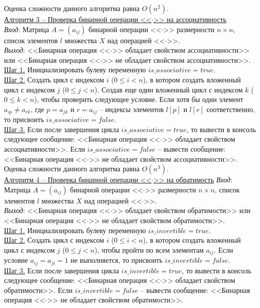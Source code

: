 \documentclass[bachelor, och, labwork]{shiza}
\begin{document}
            Оценка сложности данного алгоритма равна $O(n^2)$.\\

        \underline{Алгоритм 3 -- Проверка бинарной операции <<$\cdot$>> на ассоциативность}\\
            \textit{Вход}: Матрица $A = (a_{ij})$ бинарной операции <<$\cdot$>> размерности $n \times n$, список элементов $l$ множества $X$ над
            операцией <<$\cdot$>>.\\
            \textit{Выход}: <<Бинарная операция <<$\cdot$>> обладает свойством ассоциативности>> или 
            <<Бинарная операция <<$\cdot$>> не обладает свойством ассоциативности>>.\\
            \underline{Шаг 1.} Инициализировать булеву переменную $is\_associative = true$.\\
            \underline{Шаг 2.} Создать цикл с индексом $i$ ($0 \leq i < n$), в котором создать вложенный цикл с индексом $j$ ($0 \leq j < n$).
            Создав еще один вложенный цикл с индексом $k$ ($0 \leq k < n$), чтобы проверить следующее условие. Если хотя бы один элемент 
            $a_{ip} \neq a_{rk}$, где $p = a_{jk}$ и $r = a_{ij}$ -- индексы элементов $l[p]$ и $l[r]$ соответственно, то присвоить 
            $is\_associative = false$.\\
            \underline{Шаг 3.} Если после завершения цикла $is\_associative = true$, то вывести в консоль следующее сообщение:
            <<Бинарная операция <<$\cdot$>> обладает свойством ассоциативности>>. Если $is\_associative = false$ -- вывести сообщение:
            <<Бинарная операция <<$\cdot$>> не обладает свойством ассоциативности>>.\\
            
            Оценка сложности данного алгоритма равна $O(n^3)$.\\
        
            \underline{Алгоритм 4 -- Проверка бинарной операции <<$\cdot$>> на обратимость}
            \textit{Вход}: Матрица $A = (a_{ij})$ бинарной операции <<$\cdot$>> размерности $n \times n$, список элементов $l$ множества $X$ над
            операцией <<$\cdot$>>.\\
            \textit{Выход}: <<Бинарная операция <<$\cdot$>> обладает свойством обратимости>> или 
            <<Бинарная операция <<$\cdot$>> не обладает свойством обратимости>>.\\
            \underline{Шаг 1.} Инициализировать булеву переменную $is\_invertible = true$.\\
            \underline{Шаг 2.} Создать цикл с индексом $i$ ($0 \leq i < n$), в котором создать вложенный цикл с индексом $j$ ($0 \leq j < n$), 
            чтобы пройти по всем элементам $a_{ij}$. Если условие $a_{ij} = a_{ji} = 1$ не выполняется, то присвоить $is\_invertible = false$.\\
            \underline{Шаг 3.} Если после завершения цикла $is\_invertible = true$, то вывести в консоль следующее сообщение:
            <<Бинарная операция <<$\cdot$>> обладает свойством обратимости>>. Если $is\_invertible = false$ -- вывести сообщение:
            <<Бинарная операция <<$\cdot$>> не обладает свойством обратимости>>.\\
            
\end{document}

